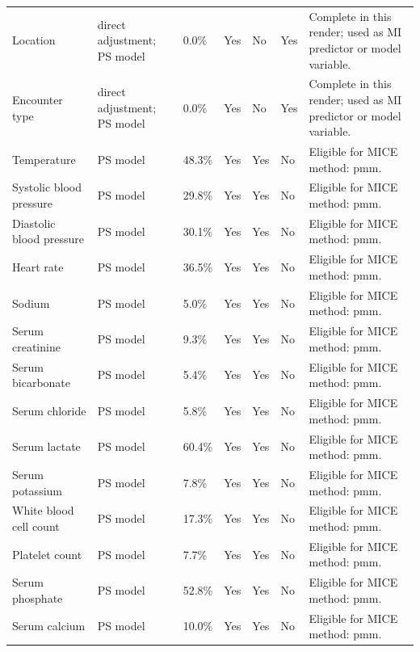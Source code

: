 \documentclass[
  11pt,
  letterpaper,
  DIV=11,
  numbers=noendperiod]{scrartcl}
\begin{document}
\begin{landscape}
\begin{table}[!h]
{\begin{tabular}{lllllll}
Location & direct adjustment; PS model & 0.0\% & Yes & No & Yes & Complete in this render; used as MI predictor or model variable.\\
Encounter type & direct adjustment; PS model & 0.0\% & Yes & No & Yes & Complete in this render; used as MI predictor or model variable.\\
Temperature & PS model & 48.3\% & Yes & Yes & No & Eligible for MICE method: pmm.\\
\addlinespace
Systolic blood pressure & PS model & 29.8\% & Yes & Yes & No & Eligible for MICE method: pmm.\\
Diastolic blood pressure & PS model & 30.1\% & Yes & Yes & No & Eligible for MICE method: pmm.\\
Heart rate & PS model & 36.5\% & Yes & Yes & No & Eligible for MICE method: pmm.\\
Sodium & PS model & 5.0\% & Yes & Yes & No & Eligible for MICE method: pmm.\\
Serum creatinine & PS model & 9.3\% & Yes & Yes & No & Eligible for MICE method: pmm.\\
\addlinespace
Serum bicarbonate & PS model & 5.4\% & Yes & Yes & No & Eligible for MICE method: pmm.\\
Serum chloride & PS model & 5.8\% & Yes & Yes & No & Eligible for MICE method: pmm.\\
Serum lactate & PS model & 60.4\% & Yes & Yes & No & Eligible for MICE method: pmm.\\
Serum potassium & PS model & 7.8\% & Yes & Yes & No & Eligible for MICE method: pmm.\\
White blood cell count & PS model & 17.3\% & Yes & Yes & No & Eligible for MICE method: pmm.\\
\addlinespace
Platelet count & PS model & 7.7\% & Yes & Yes & No & Eligible for MICE method: pmm.\\
Serum phosphate & PS model & 52.8\% & Yes & Yes & No & Eligible for MICE method: pmm.\\
Serum calcium & PS model & 10.0\% & Yes & Yes & No & Eligible for MICE method: pmm.\\
\bottomrule
\end{tabular}}
\endgroup{}
\end{table}

\end{landscape}

\clearpage
\end{document}
